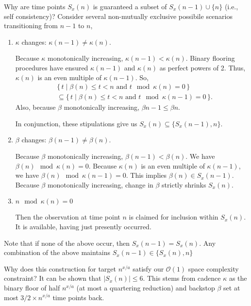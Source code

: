 Why are time points $S_x(n)$ is guaranteed a subset of $S_x(n-1) \cup \{n\}$ (i.e., self consistency)?
Consider several non-mutually exclusive possibile scenarios transitioning from $n - 1$ to $n$,
\begin{enumerate}
  \item $\kappa$ changes: $\kappa(n - 1) \neq \kappa(n)$.

  Because $\kappa$ monotonically increasing, $\kappa(n - 1) < \kappa(n)$.
  Binary flooring procedures have ensured $\kappa(n - 1)$ and $\kappa(n)$ as perfect powers of 2.
  Thus, $\kappa(n)$ is an even multiple of $\kappa(n - 1)$.
  So,
  \begin{align*}
    &\{\, t \mid \beta(n) \leq t < n \text{ and } t \mod \kappa(n) = 0 \,\}\\
    &\subseteq \{\, t \mid \beta(n) \leq t < n \text{ and } t \mod \kappa(n - 1) = 0 \,\}.
  \end{align*}
  Also, because $\beta$ monotonically increasing, $\beta{n - 1} \leq \beta{n}$.
  
  In conjunction, these stipulations give us $S_x(n) \subseteq \{S_x(n - 1), n\}$.

  \item $\beta$ changes: $\beta(n - 1) \neq \beta(n)$.

  Because $\beta$ monotonically increasing, $\beta(n - 1) < \beta(n)$.
  We have $\beta(n) \mod \kappa(n) = 0$.
  Because $\kappa(n)$ is an even multiple of $\kappa(n - 1)$, we have $\beta(n) \mod \kappa(n - 1) = 0$.
  This implies $\beta(n) \in S_x(n - 1)$.
  Because $\beta$ monotonically increasing, change in $\beta$ strictly shrinks $S_x(n)$.

  \item $n \mod \kappa(n) = 0$

  Then the observation at time point $n$ is claimed for inclusion within $S_x(n)$.
  It is available, having just presently occurred.

\end{enumerate}

Note that if none of the above occur, then $S_x(n - 1) = S_x(n)$.
Any combination of the above maintains $S_x(n - 1) \in \{S_x(n), n\}$


Why does this construction for target $n^{x/a}$ satisfy our $\mathcal{O}(1)$ space complexity constraint?
It can be shown that $|S_x(n)| \leq 6$.
This stems from cadence $\kappa$ as the binary floor of half $n^{x/a}$ (at most a quartering reduction) and backstop $\beta$ set at most $3/2 \times n^{x/a}$ time points back.

